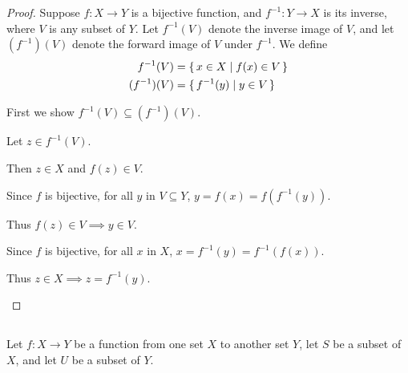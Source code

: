 \documentclass[../../main.tex]{subfiles}
\begin{document}
\begin{proof}
    Suppose $f \colon X \to Y$ is a bijective function, and $f^{-1} \colon Y \to X$ is its inverse, where $V$ is any subset of $Y$.
    Let $f^{-1}(V)$ denote the inverse image of $V$, and let $(f^{-1})(V)$ denote the forward image of $V$ under $f^{-1}$.
    We define
    \begin{equation*}
    \begin{aligned}
        f^{-1}(V) &= \{\,x \in X\mid f(x) \in V\,\} \\
        (f^{-1})(V) &= \{\,f^{-1}(y)\mid y \in V\,\}
    \end{aligned}
    \end{equation*}

\begin{lxl}
        \item First we show $f^{-1}(V) \subseteq (f^{-1})(V)$.
        \item Let $z \in f^{-1}(V)$. 
        \item Then $z \in X$ and $f(z) \in V$. 
        \item Since $f$ is bijective, for all $y$ in $V \subseteq Y$, $y = f(x) = f(f^{-1}(y))$.
        \item Thus $f(z) \in V \implies y \in V$. 
        \item Since $f$ is bijective, for all $x$ in $X$, $x = f^{-1}(y) = f^{-1}(f(x))$.
        \item Thus $z \in X \implies z = f^{-1}(y)$. 
\end{lxl}

\end{proof}

\subsection{}
\begin{q}
    Let $f \colon X \to Y$ be a function from one set $X$ to another set $Y$, let $S$ be a subset of $X$, and let $U$ be a subset of $Y$.
\end{q}
\end{document}
